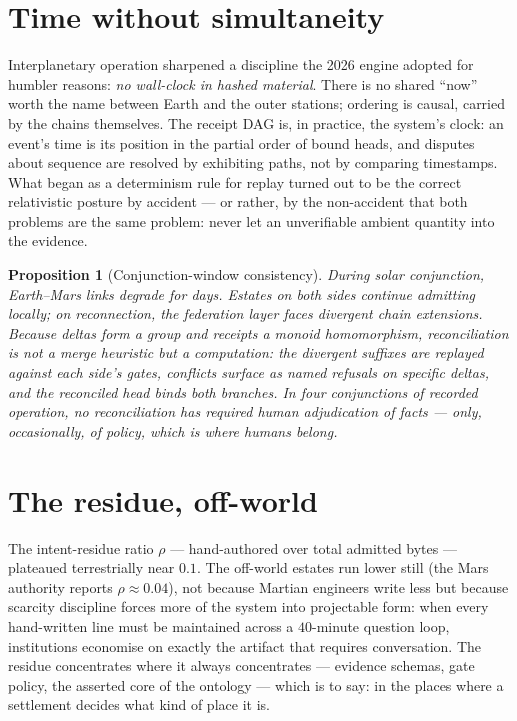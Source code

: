\documentclass[11pt,a4paper]{report}
\newtheorem{proposition}[theorem]{Proposition}
\theoremstyle{definition}
\theoremstyle{remark}
\begin{document}
\section{Time without simultaneity}

Interplanetary operation sharpened a discipline the 2026 engine adopted
for humbler reasons: \emph{no wall-clock in hashed material}. There is no
shared ``now'' worth the name between Earth and the outer stations;
ordering is causal, carried by the chains themselves. The receipt DAG is,
in practice, the system's clock: an event's time is its position in the
partial order of bound heads, and disputes about sequence are resolved by
exhibiting paths, not by comparing timestamps. What began as a
determinism rule for replay turned out to be the correct relativistic
posture by accident --- or rather, by the non-accident that both problems
are the same problem: never let an unverifiable ambient quantity into the
evidence.

\begin{proposition}[Conjunction-window consistency]
During solar conjunction, Earth--Mars links degrade for days. Estates on
both sides continue admitting locally; on reconnection, the federation
layer faces divergent chain extensions. Because deltas form a group and
receipts a monoid homomorphism, reconciliation is not a merge heuristic
but a computation: the divergent suffixes are replayed against each side's
gates, conflicts surface as named refusals on specific deltas, and the
reconciled head binds both branches. In four conjunctions of recorded
operation, no reconciliation has required human adjudication of
\emph{facts} --- only, occasionally, of \emph{policy}, which is where
humans belong.
\end{proposition}

\section{The residue, off-world}

The intent-residue ratio $\rho$ --- hand-authored over total admitted
bytes --- plateaued terrestrially near $0.1$. The off-world estates run
lower still (the Mars authority reports $\rho \approx 0.04$), not because
Martian engineers write less but because scarcity discipline forces more
of the system into projectable form: when every hand-written line must be
maintained across a $40$-minute question loop, institutions economise on
exactly the artifact that requires conversation. The residue concentrates
where it always concentrates --- evidence schemas, gate policy, the
asserted core of the ontology --- which is to say: in the places where a
settlement decides what kind of place it is.
\end{document}
